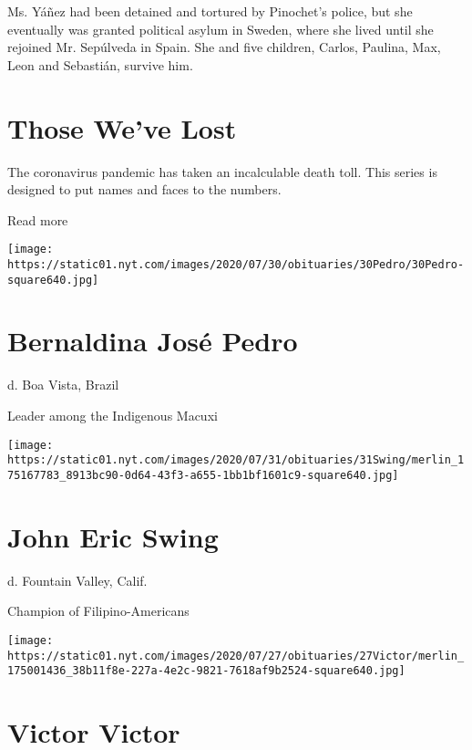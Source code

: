 Ms. Yáñez had been detained and tortured by Pinochet's police, but she
eventually was granted political asylum in Sweden, where she lived until
she rejoined Mr. Sepúlveda in Spain. She and five children, Carlos,
Paulina, Max, Leon and Sebastián, survive him.

\href{https://www.nytimes.com/interactive/2020/obituaries/people-died-coronavirus-obituaries.html?action=click\&pgtype=Article\&state=default\&region=BELOW_MAIN_CONTENT\&context=covid_obits_promo}{}

\hypertarget{those-weve-lost}{%
\section{Those We've Lost}\label{those-weve-lost}}

The coronavirus pandemic has taken an incalculable death toll. This
series is designed to put names and faces to the numbers.

Read more

\texttt{[image: https://static01.nyt.com/images/2020/07/30/obituaries/30Pedro/30Pedro-square640.jpg]}

\hypertarget{bernaldina-josuxe9-pedro}{%
\section{Bernaldina José Pedro}\label{bernaldina-josuxe9-pedro}}

d. Boa Vista, Brazil

Leader among the Indigenous Macuxi

\texttt{[image: https://static01.nyt.com/images/2020/07/31/obituaries/31Swing/merlin\_175167783\_8913bc90-0d64-43f3-a655-1bb1bf1601c9-square640.jpg]}

\hypertarget{john-eric-swing}{%
\section{John Eric Swing}\label{john-eric-swing}}

d. Fountain Valley, Calif.

Champion of Filipino-Americans

\texttt{[image: https://static01.nyt.com/images/2020/07/27/obituaries/27Victor/merlin\_175001436\_38b11f8e-227a-4e2c-9821-7618af9b2524-square640.jpg]}

\hypertarget{victor-victor}{%
\section{Victor Victor}\label{victor-victor}}

